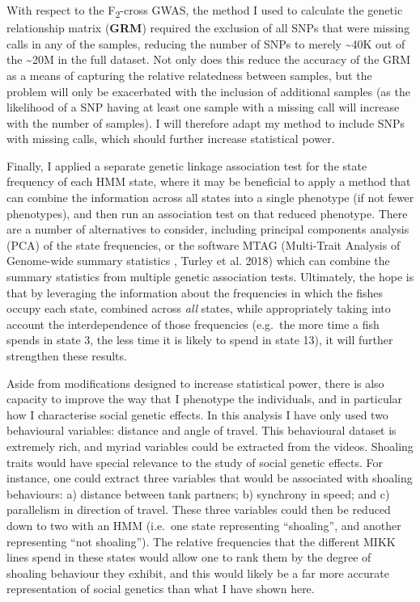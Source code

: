 \documentclass[
]{book}
\begin{document}
With respect to the F\textsubscript{2}-cross GWAS, the method I used to calculate the genetic relationship matrix (\textbf{GRM}) required the exclusion of all SNPs that were missing calls in any of the samples, reducing the number of SNPs to merely \textasciitilde40K out of the \textasciitilde20M in the full dataset. Not only does this reduce the accuracy of the GRM as a means of capturing the relative relatedness between samples, but the problem will only be exacerbated with the inclusion of additional samples (as the likelihood of a SNP having at least one sample with a missing call will increase with the number of samples). I will therefore adapt my method to include SNPs with missing calls, which should further increase statistical power.

Finally, I applied a separate genetic linkage association test for the state frequency of each HMM state, where it may be beneficial to apply a method that can combine the information across all states into a single phenotype (if not fewer phenotypes), and then run an association test on that reduced phenotype. There are a number of alternatives to consider, including principal components analysis (PCA) of the state frequencies, or the software MTAG (Multi-Trait Analysis of Genome-wide summary statistics , Turley et al. 2018) which can combine the summary statistics from multiple genetic association tests. Ultimately, the hope is that by leveraging the information about the frequencies in which the fishes occupy each state, combined across \emph{all} states, while appropriately taking into account the interdependence of those frequencies (e.g.~the more time a fish spends in state 3, the less time it is likely to spend in state 13), it will further strengthen these results.

Aside from modifications designed to increase statistical power, there is also capacity to improve the way that I phenotype the individuals, and in particular how I characterise social genetic effects. In this analysis I have only used two behavioural variables: distance and angle of travel. This behavioural dataset is extremely rich, and myriad variables could be extracted from the videos. Shoaling traits would have special relevance to the study of social genetic effects. For instance, one could extract three variables that would be associated with shoaling behaviours: a) distance between tank partners; b) synchrony in speed; and c) parallelism in direction of travel. These three variables could then be reduced down to two with an HMM (i.e.~one state representing ``shoaling'', and another representing ``not shoaling''). The relative frequencies that the different MIKK lines spend in these states would allow one to rank them by the degree of shoaling behaviour they exhibit, and this would likely be a far more accurate representation of social genetics than what I have shown here.
\end{document}

